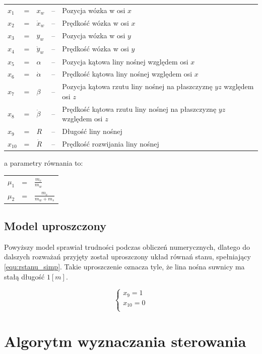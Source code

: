 \documentclass[12pt]{article}
\begin{document}
\vspace{0.5cm}
\begin{tabular}{R{0.5cm}clcl}
  $x_1$ & = & $x_w$ & -- & Pozycja wózka w osi $x$\\
  $x_2$ & = & $\dot{x}_w$ & -- & Prędkość wózka w osi $x$\\
  $x_3$ & = & $y_w$ & -- & Pozycja wózka w osi $y$\\
  $x_4$ & = & $\dot{y}_w$ & -- & Prędkość wózka w osi $y$\\
  $x_5$ & = & $\alpha$ & -- & Pozycja kątowa liny nośnej względem osi $x$\\
  $x_6$ & = & $\dot{\alpha}$ & -- & Prędkość kątowa liny nośnej względem osi $x$\\
  $x_7$ & = & $\beta$ & -- & Pozycja kątowa rzutu liny nośnej na płaszczyznę
  $yz$ względem osi $z$\\
  $x_8$ & = & $\dot{\beta}$ & -- & Prędkość kątowa rzutu liny nośnej na płaszczyznę
  $yz$ względem osi $z$\\
  $x_9$ & = & $R$ & -- & Długość liny nośnej\\
  $x_{10}$ & = & $\dot{R}$ & -- & Prędkość rozwijania liny nośnej\\
\end{tabular}
\vspace{0.5cm}

\vspace{0.2cm}
\noindent
a parametry równania to:

\vspace{0.5cm}
\begin{tabular}{R{0.5cm}cl}
  $\mu_1$ & = & $\frac{m_c}{m_w}$\\
  $\mu_2$ & = & $\frac{m_c}{m_w+m_s}$\\
\end{tabular}
\vspace{0.5cm}

\subsection{Model uproszczony}

Powyższy model sprawiał trudności podczas obliczeń numerycznych, dlatego do
dalszych rozważań przyjęty został uproszczony układ równań stanu, spełniający
\eqref{equ:rstanu_simp}. Takie uproszczenie oznacza tyle, że lina nośna suwnicy
ma stałą długość $1[m]$.

\begin{equation}
  \begin{cases}
    x_9=1\\
    x_{10}=0\\
  \end{cases}
  \label{equ:rstanu_simp}
\end{equation}

\newpage

\section{Algorytm wyznaczania sterowania}



\newpage

\printbibliography
\end{document}
